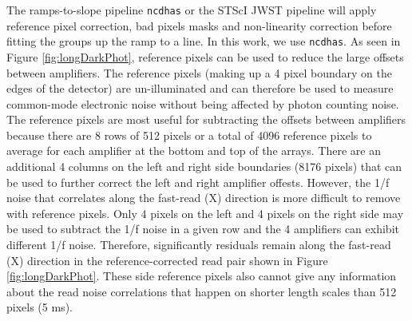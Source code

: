 \documentclass{aastex62}
\begin{document}
The ramps-to-slope pipeline \texttt{ncdhas} or the STScI JWST pipeline will apply reference pixel correction, bad pixels masks and non-linearity correction before fitting the groups up the ramp to a line.
In this work, we use \texttt{ncdhas}.
As seen in Figure \ref{fig:longDarkPhot}, reference pixels can be used to reduce the large offsets between amplifiers.
The reference pixels (making up a 4 pixel boundary on the edges of the detector) are un-illuminated and can therefore be used to measure common-mode electronic noise without being affected by photon counting noise.
The reference pixels are most useful for subtracting the offsets between amplifiers because there are 8 rows of 512 pixels or a total of 4096 reference pixels to average for each amplifier at the bottom and top of the arrays.
There are an additional 4 columns on the left and right side boundaries (8176 pixels) that can be used to further correct the left and right amplifier offests.
However, the 1/f noise that correlates along the fast-read (X) direction is more difficult to remove with reference pixels.
Only 4 pixels on the left and 4 pixels on the right side may be used to subtract the 1/f noise in a given row and the 4 amplifiers can exhibit different 1/f noise. 
Therefore, significantly residuals remain along the fast-read (X) direction in the reference-corrected read pair shown in Figure \ref{fig:longDarkPhot}.
These side reference pixels also cannot give any information about the read noise correlations that happen on shorter length scales than 512 pixels (5 ms).
\end{document}
